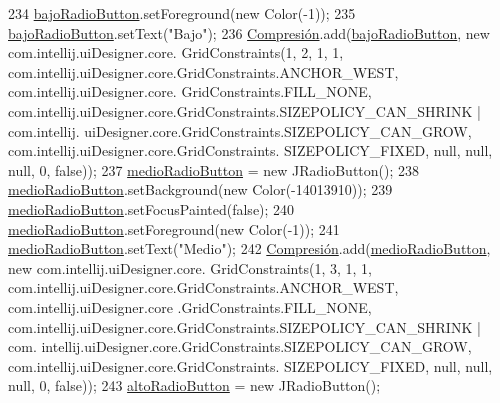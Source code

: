 \begin{DoxyCode}
234         \hyperlink{classpresentacion_1_1form_1_1PopUp__Comp_add9532658d448dcbfa9b7dd40ddc8b38}{bajoRadioButton}.setForeground(\textcolor{keyword}{new} Color(-1));
235         \hyperlink{classpresentacion_1_1form_1_1PopUp__Comp_add9532658d448dcbfa9b7dd40ddc8b38}{bajoRadioButton}.setText(\textcolor{stringliteral}{"Bajo"});
236         \hyperlink{classpresentacion_1_1form_1_1PopUp__Comp_a5769b499f21466bae765c41428512966}{Compresión}.add(\hyperlink{classpresentacion_1_1form_1_1PopUp__Comp_add9532658d448dcbfa9b7dd40ddc8b38}{bajoRadioButton}, \textcolor{keyword}{new} com.intellij.uiDesigner.core.
      GridConstraints(1, 2, 1, 1, com.intellij.uiDesigner.core.GridConstraints.ANCHOR\_WEST, com.intellij.uiDesigner.core.
      GridConstraints.FILL\_NONE, com.intellij.uiDesigner.core.GridConstraints.SIZEPOLICY\_CAN\_SHRINK | com.intellij.
      uiDesigner.core.GridConstraints.SIZEPOLICY\_CAN\_GROW, com.intellij.uiDesigner.core.GridConstraints.
      SIZEPOLICY\_FIXED, null, null, null, 0, \textcolor{keyword}{false}));
237         \hyperlink{classpresentacion_1_1form_1_1PopUp__Comp_ad1daa09264648f37642b24a698e32206}{medioRadioButton} = \textcolor{keyword}{new} JRadioButton();
238         \hyperlink{classpresentacion_1_1form_1_1PopUp__Comp_ad1daa09264648f37642b24a698e32206}{medioRadioButton}.setBackground(\textcolor{keyword}{new} Color(-14013910));
239         \hyperlink{classpresentacion_1_1form_1_1PopUp__Comp_ad1daa09264648f37642b24a698e32206}{medioRadioButton}.setFocusPainted(\textcolor{keyword}{false});
240         \hyperlink{classpresentacion_1_1form_1_1PopUp__Comp_ad1daa09264648f37642b24a698e32206}{medioRadioButton}.setForeground(\textcolor{keyword}{new} Color(-1));
241         \hyperlink{classpresentacion_1_1form_1_1PopUp__Comp_ad1daa09264648f37642b24a698e32206}{medioRadioButton}.setText(\textcolor{stringliteral}{"Medio"});
242         \hyperlink{classpresentacion_1_1form_1_1PopUp__Comp_a5769b499f21466bae765c41428512966}{Compresión}.add(\hyperlink{classpresentacion_1_1form_1_1PopUp__Comp_ad1daa09264648f37642b24a698e32206}{medioRadioButton}, \textcolor{keyword}{new} com.intellij.uiDesigner.core.
      GridConstraints(1, 3, 1, 1, com.intellij.uiDesigner.core.GridConstraints.ANCHOR\_WEST, com.intellij.uiDesigner.core
      .GridConstraints.FILL\_NONE, com.intellij.uiDesigner.core.GridConstraints.SIZEPOLICY\_CAN\_SHRINK | com.
      intellij.uiDesigner.core.GridConstraints.SIZEPOLICY\_CAN\_GROW, com.intellij.uiDesigner.core.GridConstraints.
      SIZEPOLICY\_FIXED, null, null, null, 0, \textcolor{keyword}{false}));
243         \hyperlink{classpresentacion_1_1form_1_1PopUp__Comp_a9f49f4c6ce6d4f60a7015d8699aef151}{altoRadioButton} = \textcolor{keyword}{new} JRadioButton();

\end{DoxyCode}
